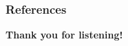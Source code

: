 \documentclass[aspectratio=169,xcolor=dvipsnames]{beamer}
\begin{document}
\begin{frame}[allowframebreaks]
    \frametitle{References}
    
    {\footnotesize }
\end{frame}


\begin{frame}
    \Huge{\centerline{\textbf{Thank you for listening!}}}
\end{frame}

\end{document}
